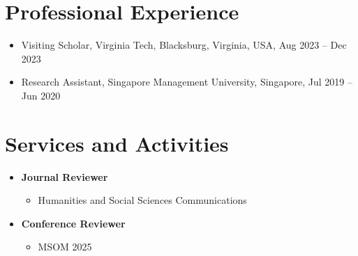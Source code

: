 \documentclass[12pt, a4paper]{article}
\begin{document}
{\begin{itemize}
\end{itemize}




\section*{Professional Experience}

\begin{itemize}[leftmargin=30pt]
    \item Visiting Scholar, Virginia Tech, Blacksburg, Virginia, USA, Aug 2023 -- Dec 2023	
    \item Research Assistant, Singapore Management University, Singapore, Jul 2019 -- Jun 2020
\end{itemize}




\section*{Services and Activities}

\begin{itemize}

	\item[] \textbf{Journal Reviewer}
	\begin{itemize}
		\item Humanities and Social Sciences Communications
	\end{itemize}

	\item[] \textbf{Conference Reviewer}
	\begin{itemize}
		\item MSOM 2025
	\end{itemize}


\end{itemize}}
\end{document}
